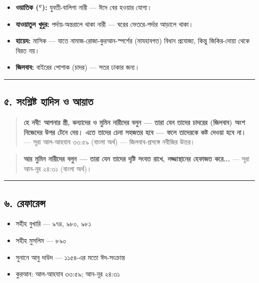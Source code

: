 \begin{itemize}
\item \textbf{ওয়াতিক (ʿ):} যুবতী-বালিগা নারী — ঈদে বের হওয়ার যোগ্য।
\item \textbf{যাওয়াতুল খুদুর:} পর্দায়-অন্তরালে থাকা নারী — ঘরের ভেতরে-পর্দার আড়ালে থাকা।
\item \textbf{হায়েয:} মাসিক — যাতে নামাজ-রোজা-কুরআন-স্পর্শের (মাযহাবগত) বিধান প্রযোজ্য, কিন্তু জিকির-দোয়া থেকে বিরত নয়।
\item \textbf{জিলবাব:} বাইরের পোশাক (চাদর) — সতর ঢাকার জন্য।
\end{itemize}
\medskip\hrule\medskip

\subsection*{৫. সংশ্লিষ্ট হাদিস ও আয়াত}

\begin{quote}
\textbf{হে নবী! আপনার স্ত্রী, কন্যাদের ও মুমিন নারীদের বলুন — তারা যেন তাদের চাদরের (জিলবাব) অংশ নিজেদের উপর টেনে দেয়। এতে তাদের চেনা সহজতর হবে — ফলে তাদেরকে কষ্ট দেওয়া হবে না।} — সূরা আল-আহযাব ৩৩:৫৯ (বাংলা অর্থ) — জিলবাব-প্রসঙ্গে নবীজির উত্তর।
\end{quote}

\begin{quote}
\textbf{আর মুমিন নারীদের বলুন — তারা যেন তাদের দৃষ্টি সংযত রাখে, লজ্জাস্থানের হেফাজত করে...} — সূরা আন-নূর ২৪:৩১ (বাংলা অর্থ)।
\end{quote}

\medskip\hrule\medskip

\subsection*{৬. রেফারেন্স}

\begin{itemize}
\item সহীহ বুখারি — ৯৭৪, ৯৮০, ৯৮১
\item সহীহ মুসলিম — ৮৯০
\item সুনানে আবু দাউদ — ১১৫৪-এর মতো ঈদ-সংক্রান্ত
\item কুরআন: আল-আহযাব ৩৩:৫৯; আন-নূর ২৪:৩১
\end{itemize}


